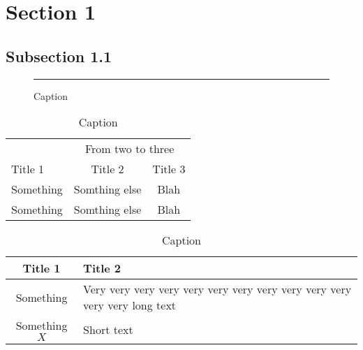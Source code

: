 \section{Section 1}
\subsection{Subsection 1.1}

\begin{figure}[h]
	\centering
	\textcolor{gray}{\rule{8cm}{4cm}}
	\caption{Caption}
	\label{fig:}
\end{figure}

\begin{table}[H]
	\centering
	\begin{tabular}{l c c}
		\toprule
		\toprule
		& \multicolumn{2}{c}{From two to three} \\
		\cmidrule(l){2-3}
		Title 1 & Title 2 & Title 3 \\
		\midrule
		Something & Somthing else & Blah \\
		Something & Somthing else & Blah \\
		\bottomrule
	\end{tabular}
	\caption{Caption}
	\label{tab:}
\end{table}

\begin{table}[H]
	\centering
	\begin{tabularx}{0.9\textwidth}{cX}
		\toprule
		Title 1 & Title 2 \\
		\midrule
		Something & Very very very very very very very very very very very very very long text \\
		Something $X$ & Short text \\
		\bottomrule
	\end{tabularx}
	\caption{Caption}
	\label{tab:}
\end{table}
